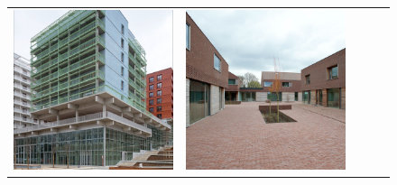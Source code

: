 \begin{figure}[H]
{\begin{tabular}{@{}ccccc@{}}
      \includegraphics[width=\linewidth]{Images/LoRAs/Plintwerking/Training_images/8.jpeg} &
      \includegraphics[width=\linewidth]{Images/LoRAs/Plintwerking/Training_images/9.jpg} &

\end{tabular}}
\end{figure}
